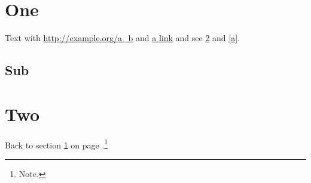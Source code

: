 \documentclass{article}
\begin{document}
\tableofcontents
\section{One}\label{a}
Text with \url{http://example.org/a_b} and \href{http://example.com}{a link} and see \ref{b} and \autoref{a}.
\subsection{Sub}\newpage
\section{Two}\label{b}
Back to section \ref{a} on page \pageref{a}.\footnote{Note.}
\end{document}

